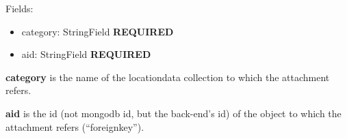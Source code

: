 \documentclass[letterpaper,10pt,english]{sphinxmanual}
\begin{document}
\begin{fulllineitems}
\label{codedoc/msgdoc:lbd_backend.LBD_REST_messagedata.models.Attachment}
Fields:
\begin{itemize}
\item {} 
category: StringField \textbf{REQUIRED}

\item {} 
aid: StringField \textbf{REQUIRED}

\end{itemize}

\textbf{category} is the name of the locationdata collection to which the attachment refers.

\textbf{aid} is the id (not mongodb id, but the back-end's id) of the object to which the attachment refers (``foreignkey'').

\end{fulllineitems}

\end{document}
